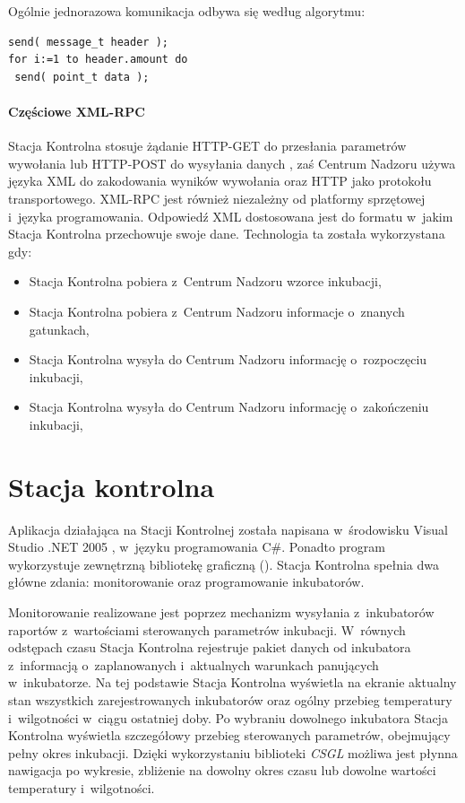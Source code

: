 Ogólnie jednorazowa komunikacja odbywa się według algorytmu:
\begin{verbatim}
send( message_t header );
for i:=1 to header.amount do 
 send( point_t data );\end{verbatim}

\paragraph{Częściowe XML-RPC}
Stacja Kontrolna stosuje żądanie 
HTTP-GET do przesłania parametrów wywołania lub HTTP-POST do wysyłania danych
, zaś Centrum Nadzoru używa języka XML do
zakodowania wyników wywołania oraz HTTP jako protokołu transportowego. XML-RPC
jest również niezależny od platformy sprzętowej i~języka programowania. 
Odpowiedź XML dostosowana jest do formatu w~jakim Stacja Kontrolna przechowuje swoje dane. 
Technologia ta została wykorzystana gdy:
\begin{itemize}
\item Stacja Kontrolna pobiera z~Centrum Nadzoru wzorce inkubacji, 
\item Stacja Kontrolna pobiera z~Centrum Nadzoru informacje o~znanych gatunkach,
\item Stacja Kontrolna wysyła do Centrum Nadzoru informację o~rozpoczęciu inkubacji,
\item Stacja Kontrolna wysyła do Centrum Nadzoru informację o~zakończeniu inkubacji,
\end{itemize}

\section{Stacja kontrolna}
Aplikacja działająca na Stacji Kontrolnej została napisana w~środowisku
Visual Studio .NET 2005 \cite{MSDN}, w~języku programowania C\#. Ponadto program
wykorzystuje zewnętrzną bibliotekę graficzną  (). Stacja Kontrolna spełnia dwa główne
zdania: monitorowanie oraz programowanie inkubatorów.

Monitorowanie realizowane jest poprzez mechanizm wysyłania z~inkubatorów
raportów z~wartościami sterowanych parametrów inkubacji. W~równych odstępach czasu Stacja Kontrolna rejestruje pakiet
danych od inkubatora z~informacją o~zaplanowanych i~aktualnych warunkach
panujących w~inkubatorze. Na tej podstawie Stacja Kontrolna wyświetla na ekranie aktualny stan
wszystkich zarejestrowanych inkubatorów oraz ogólny przebieg temperatury
i~wilgotności w~ciągu ostatniej doby. Po wybraniu dowolnego inkubatora Stacja Kontrolna
wyświetla szczegółowy przebieg sterowanych parametrów, obejmujący pełny okres
inkubacji. Dzięki wykorzystaniu biblioteki \emph{CSGL} możliwa jest płynna nawigacja
po wykresie, zbliżenie na dowolny okres czasu lub dowolne wartości temperatury
i~wilgotności.

